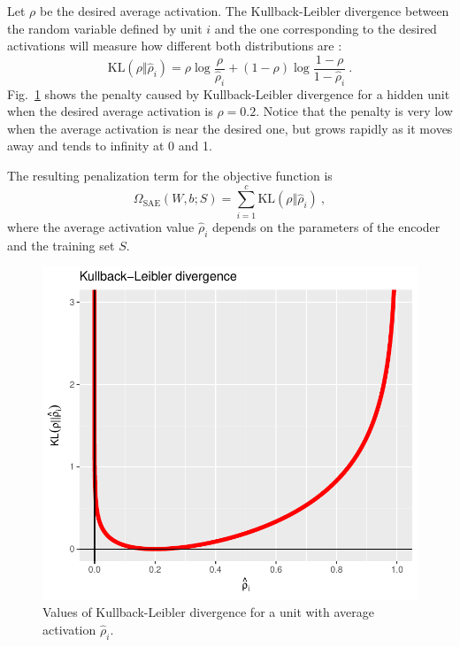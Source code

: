 Let $\rho$ be the desired average activation. The Kullback-Leibler divergence \cite{kullback1951information} between the random variable defined by unit $i$ and the one corresponding to the desired activations will measure how different both distributions are \cite{ng2011sparse}:
\begin{equation}\label{Eq.KLdivergence}
  \mathrm{KL}(\rho\Vert \hat\rho_i)=\rho \log\frac\rho{\hat\rho_i} + (1 - \rho)\log\frac{1 - \rho}{1 - \hat\rho_i}~.
\end{equation}
Fig.~\ref{Fig.KLdivergence} shows the penalty caused by Kullback-Leibler divergence for a hidden unit when the desired average activation is $\rho=0.2$. Notice that the penalty is very low when the average activation is near the desired one, but grows rapidly as it moves away and tends to infinity at 0 and 1.

The resulting penalization term for the objective function is
\begin{equation}
  \Omega_{\mathrm{SAE}}(W,b;S)=\sum_{i=1}^c \mathrm{KL}(\rho\Vert \hat\rho_i)~,
\end{equation}
where the average activation value $\hat\rho_i$ depends on the parameters of the encoder and the training set $S$.

\begin{figure}[ht!]
	\centering
	\includegraphics[width=0.9\figwidth]{kldivergence.pdf} 

	\caption{Values of Kullback-Leibler divergence for a unit with average activation $\hat\rho_i$.}
	\label{Fig.KLdivergence}
\end{figure}


